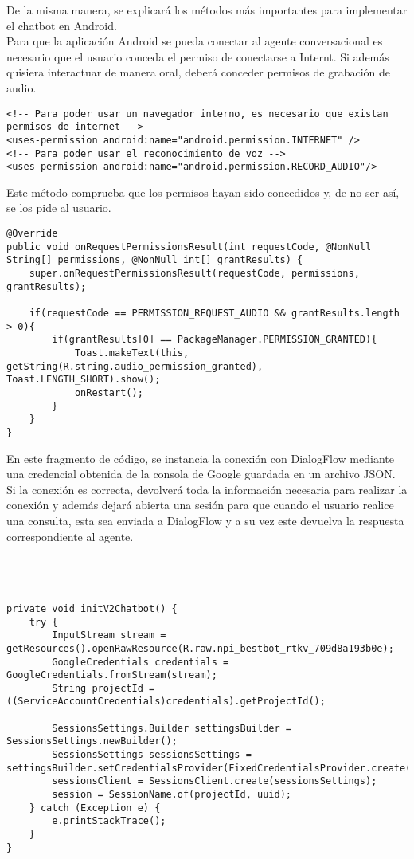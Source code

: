 \documentclass[11pt,a4paper]{article}
\begin{document}
De la misma manera, se explicará los métodos más importantes para implementar el chatbot en Android.\\

Para que la aplicación Android se pueda conectar al agente conversacional es necesario que el usuario conceda el permiso de conectarse a Internt. Si además quisiera interactuar de manera oral, deberá conceder permisos de grabación de audio.\\

\begin{lstlisting}
<!-- Para poder usar un navegador interno, es necesario que existan permisos de internet -->
<uses-permission android:name="android.permission.INTERNET" />
<!-- Para poder usar el reconocimiento de voz -->
<uses-permission android:name="android.permission.RECORD_AUDIO"/>
\end{lstlisting}

Este método comprueba que los permisos hayan sido concedidos y, de no ser así, se los pide al usuario.\\

\begin{lstlisting}
@Override
public void onRequestPermissionsResult(int requestCode, @NonNull String[] permissions, @NonNull int[] grantResults) {
    super.onRequestPermissionsResult(requestCode, permissions, grantResults);

    if(requestCode == PERMISSION_REQUEST_AUDIO && grantResults.length > 0){
        if(grantResults[0] == PackageManager.PERMISSION_GRANTED){
            Toast.makeText(this, getString(R.string.audio_permission_granted), Toast.LENGTH_SHORT).show();
            onRestart();
        }
    }
}
\end{lstlisting}

En este fragmento de código, se instancia la conexión con DialogFlow mediante una credencial obtenida de la consola de Google guardada en un archivo JSON. Si la conexión es correcta, devolverá toda la información necesaria para realizar la conexión y además dejará abierta una sesión para que cuando el usuario realice una consulta, esta sea enviada a DialogFlow y a su vez este devuelva la respuesta correspondiente al agente.\\\\\\\\

\begin{lstlisting}
private void initV2Chatbot() {
    try {
        InputStream stream = getResources().openRawResource(R.raw.npi_bestbot_rtkv_709d8a193b0e);
        GoogleCredentials credentials = GoogleCredentials.fromStream(stream);
        String projectId = ((ServiceAccountCredentials)credentials).getProjectId();

        SessionsSettings.Builder settingsBuilder = SessionsSettings.newBuilder();
        SessionsSettings sessionsSettings = settingsBuilder.setCredentialsProvider(FixedCredentialsProvider.create(credentials)).build();
        sessionsClient = SessionsClient.create(sessionsSettings);
        session = SessionName.of(projectId, uuid);
    } catch (Exception e) {
        e.printStackTrace();
    }
}
\end{lstlisting}
\end{document}
